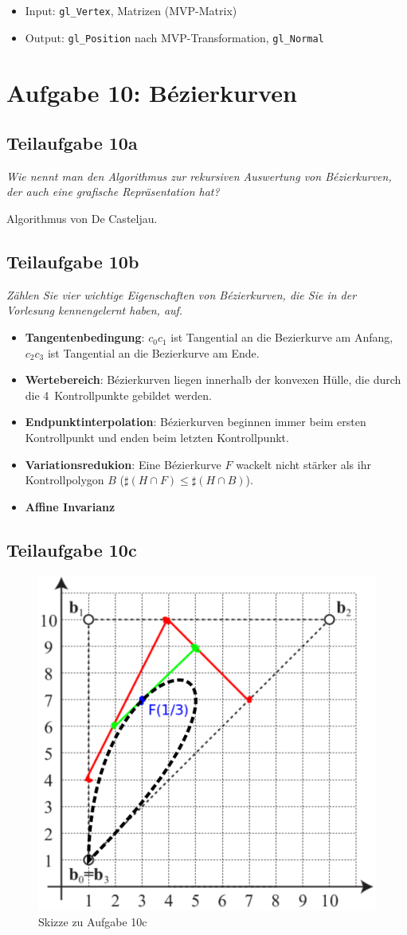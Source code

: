 \documentclass[a4paper]{scrartcl}
\begin{document}
\begin{itemize}
    \item Input: \texttt{gl\_Vertex}, Matrizen (MVP-Matrix)
    \item Output: \texttt{gl\_Position} nach MVP-Transformation, \texttt{gl\_Normal}
\end{itemize}


\section*{Aufgabe 10: Bézierkurven}
\subsection*{Teilaufgabe 10a}
\textit{Wie nennt man den Algorithmus zur rekursiven Auswertung von
Bézierkurven, der auch eine grafische Repräsentation hat?}

Algorithmus von De Casteljau.

\clearpage
\subsection*{Teilaufgabe 10b}
\textit{Zählen Sie vier wichtige Eigenschaften von Bézierkurven, die Sie in der
Vorlesung kennengelernt haben, auf.}

\begin{itemize}
    \item \textbf{Tangentenbedingung}:
          $c_0 c_1$ ist Tangential an die Bezierkurve am Anfang,
          $c_2 c_3$ ist Tangential an die Bezierkurve am Ende.
    \item \textbf{Wertebereich}: Bézierkurven liegen innerhalb der konvexen
          Hülle, die durch die 4~Kontrollpunkte gebildet werden.
    \item \textbf{Endpunktinterpolation}: Bézierkurven beginnen immer beim
          ersten Kontrollpunkt und enden beim letzten Kontrollpunkt.
    \item \textbf{Variationsredukion}: Eine Bézierkurve $F$ wackelt nicht stärker
          als ihr Kontrollpolygon $B$ ($\sharp (H \cap F) \leq \sharp (H \cap B)$).
    \item \textbf{Affine Invarianz}
\end{itemize}

\subsection*{Teilaufgabe 10c}
\begin{figure}[h]
    \centering
    \includegraphics*[width=0.7\linewidth, keepaspectratio]{10c-bezier.png}
    \caption{Skizze zu Aufgabe 10c}
    \label{fig:10c}
\end{figure}
\end{document}
